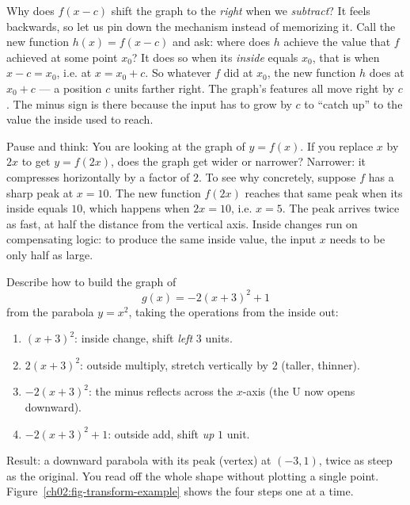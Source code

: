 \begin{whybox}
Why does $f(x-c)$ shift the graph to the \emph{right} when we \emph{subtract}? It
feels backwards, so let us pin down the mechanism instead of memorizing it. Call
the new function $h(x) = f(x-c)$ and ask: where does $h$ achieve the value that
$f$ achieved at some point $x_0$? It does so when its \emph{inside} equals $x_0$,
that is when $x - c = x_0$, i.e. at $x = x_0 + c$. So whatever $f$ did at $x_0$,
the new function $h$ does at $x_0 + c$ --- a position $c$ units farther right. The
graph's features all move right by $c$. The minus sign is there because
the input has to grow by $c$ to ``catch up'' to the value the inside used to reach.
\end{whybox}

\begin{recoverybox}
Pause and think: You are looking at the graph of $y = f(x)$. If you replace $x$ by
$2x$ to get $y = f(2x)$, does the graph get wider or narrower?
Narrower: it compresses horizontally by a factor of $2$. To see why concretely,
suppose $f$ has a sharp peak at $x = 10$. The new function $f(2x)$ reaches that
same peak when its inside equals $10$, which happens when $2x = 10$, i.e. $x = 5$.
The peak arrives twice as fast, at half the distance from the vertical axis.
Inside changes run on compensating logic: to produce the same inside value, the
input $x$ needs to be only half as large.
\end{recoverybox}

\begin{example}
\label{ch02:ex-transform}
Describe how to build the graph of
\[
  g(x) = -2(x+3)^2 + 1
\]
from the parabola $y = x^2$, taking the operations from the inside out:
\begin{enumerate}
  \item $(x+3)^2$: inside change, shift \emph{left} $3$ units.
  \item $2(x+3)^2$: outside multiply, stretch vertically by $2$ (taller, thinner).
  \item $-2(x+3)^2$: the minus reflects across the $x$-axis (the U now opens
        downward).
  \item $-2(x+3)^2 + 1$: outside add, shift \emph{up} $1$ unit.
\end{enumerate}
Result: a downward parabola with its peak (vertex) at $(-3, 1)$, twice as steep as
the original. You read off the whole shape without plotting a single point.
Figure~\ref{ch02:fig-transform-example} shows the four steps one at a time.
\end{example}

